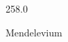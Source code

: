 \documentclass[12pt]{article}
\begin{document}
\hfill{}
\vfill
\begin{center}
  {\fontsize{50}{60}
  }

  \vspace{1em}

  258.0

Mendelevium
\end{center}
\vfill
\end{document}
